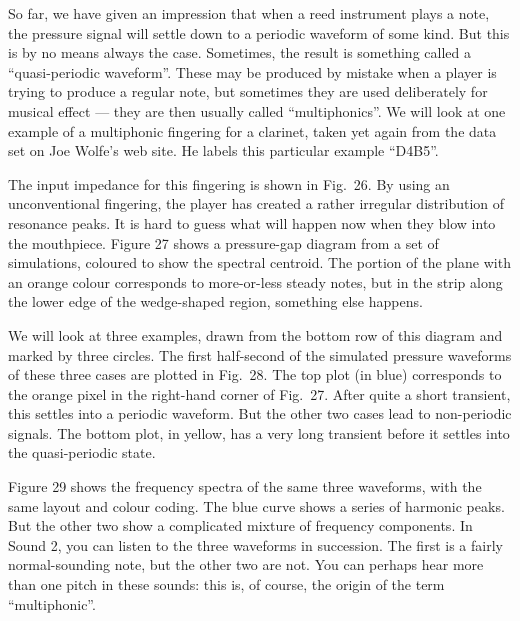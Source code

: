 
  So far, we have given an impression that when a reed instrument plays a note, 
  the pressure signal will settle down to a periodic waveform of some kind. But 
  this is by no means always the case. Sometimes, the result is something 
  called a “quasi-periodic waveform”. These may be produced by mistake when a 
  player is trying to produce a regular note, but sometimes they are used 
  deliberately for musical effect — they are then usually called 
  “multiphonics”. We will look at one example of a multiphonic fingering for a 
  clarinet, taken yet again from the data set on Joe Wolfe’s web site. He 
  labels this particular example “D4B5”. 

  The input impedance for this fingering is shown in Fig.\ 26. By using an 
  unconventional fingering, the player has created a rather irregular 
  distribution of resonance peaks. It is hard to guess what will happen now 
  when they blow into the mouthpiece. Figure 27 shows a pressure-gap diagram 
  from a set of simulations, coloured to show the spectral centroid. The 
  portion of the plane with an orange colour corresponds to more-or-less steady 
  notes, but in the strip along the lower edge of the wedge-shaped region, 
  something else happens. 

  We will look at three examples, drawn from the bottom row of this diagram and 
  marked by three circles. The first half-second of the simulated pressure 
  waveforms of these three cases are plotted in Fig.\ 28. The top plot (in 
  blue) corresponds to the orange pixel in the right-hand corner of Fig.\ 27. 
  After quite a short transient, this settles into a periodic waveform. But the 
  other two cases lead to non-periodic signals. The bottom plot, in yellow, has 
  a very long transient before it settles into the quasi-periodic state. 

  Figure 29 shows the frequency spectra of the same three waveforms, with the 
  same layout and colour coding. The blue curve shows a series of harmonic 
  peaks. But the other two show a complicated mixture of frequency components. 
  In Sound 2, you can listen to the three waveforms in succession. The first is 
  a fairly normal-sounding note, but the other two are not. You can perhaps 
  hear more than one pitch in these sounds: this is, of course, the origin of 
  the term “multiphonic”. 

